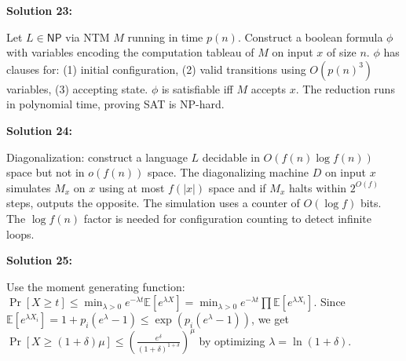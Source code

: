 \documentclass[12pt,a4paper]{exam}
\begin{document}
\textbf{Solution 23:}

Let $L \in \mathsf{NP}$ via NTM $M$ running in time $p(n)$. Construct a boolean formula $\phi$ with variables encoding the computation tableau of $M$ on input $x$ of size $n$. $\phi$ has clauses for: (1) initial configuration, (2) valid transitions using $O(p(n)^3)$ variables, (3) accepting state. $\phi$ is satisfiable iff $M$ accepts $x$. The reduction runs in polynomial time, proving SAT is NP-hard.

\vspace{0.5cm}

\textbf{Solution 24:}

Diagonalization: construct a language $L$ decidable in $O(f(n)\log f(n))$ space but not in $o(f(n))$ space. The diagonalizing machine $D$ on input $x$ simulates $M_x$ on $x$ using at most $f(|x|)$ space and if $M_x$ halts within $2^{O(f)}$ steps, outputs the opposite. The simulation uses a counter of $O(\log f)$ bits. The $\log f(n)$ factor is needed for configuration counting to detect infinite loops.

\vspace{0.5cm}

\textbf{Solution 25:}

Use the moment generating function: $\Pr[X \geq t] \leq \min_{\lambda > 0} e^{-\lambda t} \mathbb{E}[e^{\lambda X}] = \min_{\lambda > 0} e^{-\lambda t} \prod \mathbb{E}[e^{\lambda X_i}]$. Since $\mathbb{E}[e^{\lambda X_i}] = 1 + p_i(e^\lambda - 1) \leq \exp(p_i(e^\lambda - 1))$, we get $\Pr[X \geq (1+\delta)\mu] \leq (\frac{e^\delta}{(1+\delta)^{1+\delta}})^\mu$ by optimizing $\lambda = \ln(1+\delta)$.

\vspace{0.5cm}
\end{document}
